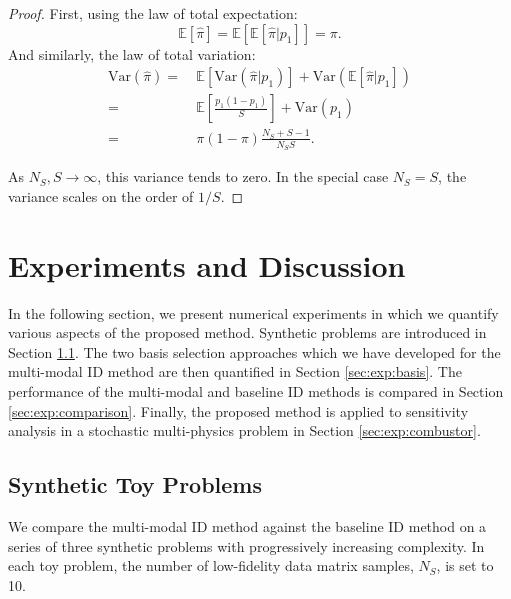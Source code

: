 \documentclass[preprint,10pt]{elsarticle}
\begin{document}
\begin{proof}
First, using the law of total expectation:
\begin{equation}
    \mathbb{E}[\hat{\pi}] = \mathbb{E}[\mathbb{E}[\hat{\pi} | p_1]] = \pi.
\end{equation}
And similarly, the law of total variation:
\begin{align}
    \textrm{Var}(\hat{\pi}) =& \ \mathbb{E}[\textrm{Var}(\hat{\pi} | p_1)] + \textrm{Var}(\mathbb{E}[\hat{\pi} | p_1]) \\
     =& \ \mathbb{E} \left[ \frac{p_1 (1 - p_1)}{S} \right] + \textrm{Var}(p_1) \\ 
     =& \ \pi (1 - \pi) \frac{N_S + S -1}{N_S S}.
     \label{eq:var_pi}
\end{align}

As $N_S, S \to \infty$, this variance tends to zero. In the special case $N_S = S$, the variance scales on the order of $1/S$.
\end{proof}











\section{Experiments and Discussion}
\label{sec:experiments}


In the following section, we present numerical experiments in which we quantify various aspects of the proposed method. Synthetic problems are introduced in Section \ref{sec:toy_probs}. The two basis selection approaches which we have developed for the multi-modal ID method are then quantified in Section \ref{sec:exp:basis}. The performance of the multi-modal and baseline ID methods is compared in Section \ref{sec:exp:comparison}. Finally, the proposed method is applied to sensitivity analysis in a stochastic multi-physics problem in Section \ref{sec:exp:combustor}.



\subsection{Synthetic Toy Problems}
\label{sec:toy_probs}

We compare the multi-modal ID method against the baseline ID method on a series of three synthetic problems with progressively increasing complexity.
In each toy problem, the number of low-fidelity data matrix samples, $N_S$, is set to 10. 
\end{document}
